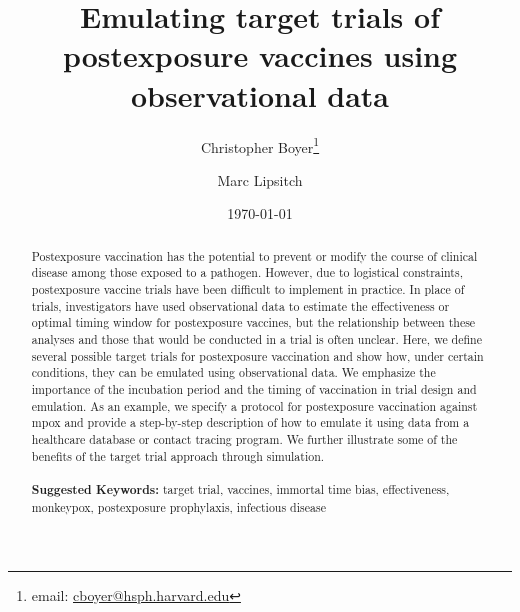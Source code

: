 \documentclass[11pt]{article}
\begin{document}
\begin{titlepage}
\title{Emulating target trials of postexposure vaccines using observational data}
\author[1]{Christopher Boyer\thanks{email: \href{mailto:cboyer@hsph.harvard.edu}{cboyer@hsph.harvard.edu}}}
\author[1,2]{Marc Lipsitch}
\date{\today}
\maketitle

\begin{abstract}
Postexposure vaccination has the potential to prevent or modify the course of clinical disease among those exposed to a pathogen. However, due to logistical constraints, postexposure vaccine trials have been difficult to implement in practice. In place of trials, investigators have used observational data to estimate the effectiveness or optimal timing window for postexposure vaccines, but the relationship between these analyses and those that would be conducted in a trial is often unclear. Here, we define several possible target trials for postexposure vaccination and show how, under certain conditions, they can be emulated using observational data. We emphasize the importance of the incubation period and the timing of vaccination in trial design and emulation. As an example, we specify a protocol for postexposure vaccination against mpox and provide a step-by-step description of how to emulate it using data from a healthcare database or contact tracing program. We further illustrate some of the benefits of the target trial approach through simulation.
\noindent \\
\vspace{0in} \\
\noindent\textbf{Suggested Keywords:} target trial, vaccines, immortal time bias, effectiveness, monkeypox, postexposure prophylaxis, infectious disease \\
\end{abstract}
\setcounter{page}{0}
\thispagestyle{empty}
\end{titlepage}
\pagebreak \newpage
\doublespacing

\doparttoc %
\faketableofcontents %
\end{document}
